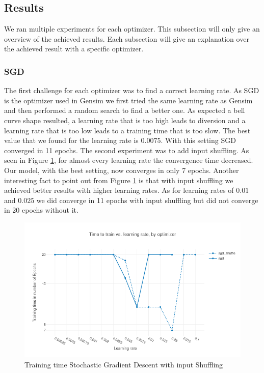 

\subsection{Results}
We ran multiple experiments for each optimizer. This subsection will only give an overview of the achieved results. Each subsection will give an explanation over the achieved result with a specific optimizer.

\subsubsection{SGD}
The first challenge for each optimizer was to find a correct learning rate. As SGD is the optimizer used in Gensim \cite{gensim} we first tried the same learning rate as Gensim \cite{gensim} and then performed a random search to find a better one. As expected a bell curve shape resulted, a learning rate that is too high leads to diversion and a learning rate that is too low leads to a training time that is too slow. The best value that we found for the learning rate is $0.0075$. With this setting SGD converged in 11 epochs. The second experiment was to add input shuffling.
As seen in Figure \ref{fig:results_sgd}, for almost every learning rate the convergence time decreased. Our model, with the best setting, now converges in only 7 epochs. Another interesting fact to point out from Figure \ref{fig:results_sgd} is that with input shuffling we achieved better results with higher learning rates. As for learning rates of $0.01$ and $0.025$ we did converge in 11 epochs with input shuffling but did not converge in 20 epochs without it.

\begin{figure}[h]
\centering
\includegraphics[scale=0.45]{images/results_sgd_shuffle}
\caption{Training time Stochastic Gradient Descent with input Shuffling}
\label{fig:results_sgd}
\end{figure}
